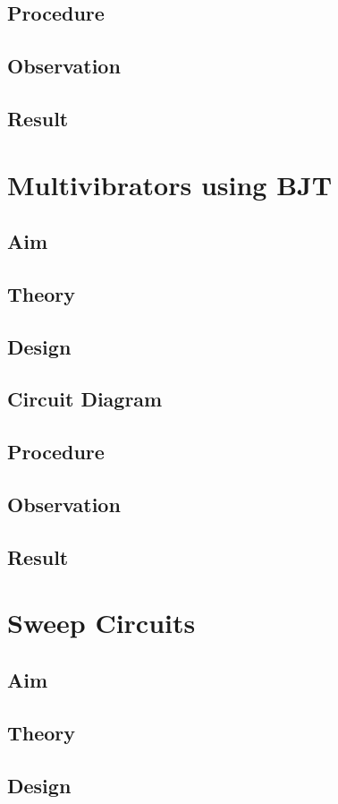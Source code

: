 \documentclass{book}
\begin{document}
\section*{Procedure}
\section*{Observation}
\section*{Result}
\chapter[Multivibrators using BJT]{Multivibrators using BJT}
\section*{Aim}
\section*{Theory}
\section*{Design}
\section*{Circuit Diagram}
\section*{Procedure}
\section*{Observation}
\section*{Result}
\chapter[Sweep Circuits]{Sweep Circuits}
\section*{Aim}
\section*{Theory}
\section*{Design}
\end{document}
